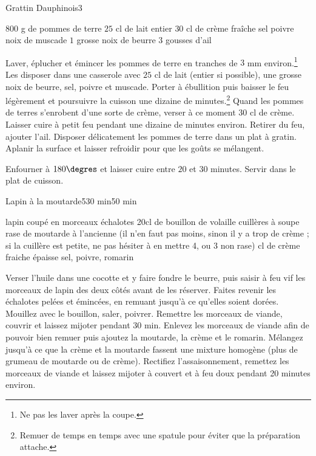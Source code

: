 \begin{recette}{Grattin Dauphinois}{3}{}{}
\begin{ingredients}
\ingredient $800$ g de pommes de terre
\ingredient $25$ cl de lait entier
\ingredient $30$ cl de crème fraîche
\ingredient sel
\ingredient poivre
\ingredient noix de muscade
\ingredient $1$ grosse noix de beurre
\ingredient $3$ gousses d'ail
\end{ingredients}

\begin{preparation}
\etape Laver, éplucher et émincer les pommes de terre en tranches de $3$ mm environ.\footnote{Ne pas les laver après la coupe.}
\etape Les disposer dans une casserole avec $25$ cl de lait (entier si possible), une grosse noix de beurre, sel, poivre et muscade.
\etape Porter à ébullition puis baisser le feu légèrement et poursuivre la cuisson une dizaine de minutes.\footnote{Remuer de temps en temps avec une spatule pour éviter que la préparation attache.}
\etape Quand les pommes de terres s'enrobent d'une sorte de crème, verser à ce moment $30$ cl de crème.
\etape Laisser cuire à petit feu pendant une dizaine de minutes environ.
\etape Retirer du feu, ajouter l'ail.
\etape Disposer délicatement les pommes de terre dans un plat à gratin.
\etape Aplanir la surface et laisser refroidir pour que les goûts se mélangent.
\end{preparation}

\begin{cuisson}
Enfourner à $180\degres$ et laisser cuire entre $20$ et $30$ minutes. Servir dans le plat de cuisson.
\end{cuisson}
\end{recette}

\begin{recette}{Lapin à la moutarde}{5}{30 min}{50 min}
\begin{ingredients}[6 pers.]
 lapin coupé en morceaux
 échalotes
\ingredient 20cl de bouillon de volaille
 cuillères à soupe rase de moutarde à l'ancienne (il n'en faut pas moins, sinon il y a trop de crème ; si la cuillère est petite, ne pas hésiter à en mettre 4, ou 3 non rase)
 cl de crème fraiche épaisse
\ingredient sel, poivre, romarin
\end{ingredients}

\begin{preparation}
\etape Verser l'huile dans une cocotte et y faire fondre le beurre, puis saisir à feu vif les morceaux de lapin des deux côtés avant de les réserver.
\etape Faites revenir les échalotes pelées et émincées, en remuant jusqu'à ce qu'elles soient dorées.
\etape Mouillez avec le bouillon, saler, poivrer. Remettre les morceaux de viande, couvrir et laissez mijoter pendant 30 min.
\etape Enlevez les morceaux de viande afin de pouvoir bien remuer puis ajoutez la moutarde, la crème et le romarin. Mélangez jusqu'à ce que la crème et la moutarde fassent une mixture homogène (plus de grumeau de moutarde ou de crème). 
\etape Rectifiez l'assaisonnement, remettez les morceaux de viande et laissez mijoter à couvert et à feu doux pendant 20 minutes environ.
\end{preparation}
\end{recette}

